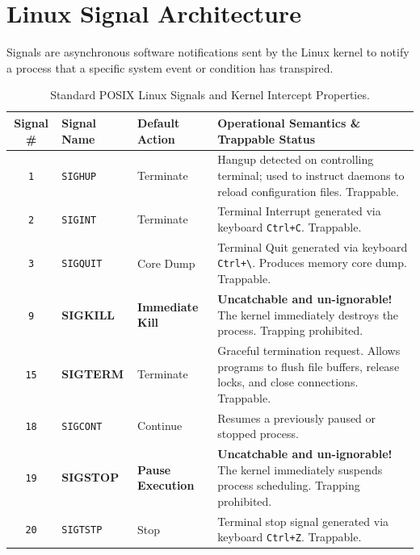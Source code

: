 \section{Linux Signal Architecture}
Signals are asynchronous software notifications sent by the Linux kernel to notify a process that a specific system event or condition has transpired.

\begin{table}[htbp]
\centering
\small
\begin{tabularx}{\linewidth}{c l l X}
\toprule
\textbf{Signal \#} & \textbf{Signal Name} & \textbf{Default Action} & \textbf{Operational Semantics \& Trappable Status} \\
\midrule
\texttt{1} & \texttt{SIGHUP} & Terminate & Hangup detected on controlling terminal; used to instruct daemons to reload configuration files. Trappable. \\
\texttt{2} & \texttt{SIGINT} & Terminate & Terminal Interrupt generated via keyboard \texttt{Ctrl+C}. Trappable. \\
\texttt{3} & \texttt{SIGQUIT} & Core Dump & Terminal Quit generated via keyboard \texttt{Ctrl+\textbackslash}. Produces memory core dump. Trappable. \\
\texttt{9} & \textbf{SIGKILL} & \textbf{Immediate Kill} & \textbf{Uncatchable and un-ignorable!} The kernel immediately destroys the process. Trapping prohibited. \\
\texttt{15} & \textbf{SIGTERM} & Terminate & Graceful termination request. Allows programs to flush file buffers, release locks, and close connections. Trappable. \\
\texttt{18} & \texttt{SIGCONT} & Continue & Resumes a previously paused or stopped process. \\
\texttt{19} & \textbf{SIGSTOP} & \textbf{Pause Execution} & \textbf{Uncatchable and un-ignorable!} The kernel immediately suspends process scheduling. Trapping prohibited. \\
\texttt{20} & \texttt{SIGTSTP} & Stop & Terminal stop signal generated via keyboard \texttt{Ctrl+Z}. Trappable. \\
\bottomrule
\end{tabularx}
\caption{Standard POSIX Linux Signals and Kernel Intercept Properties.}
\label{tab:signals}
\end{table}

